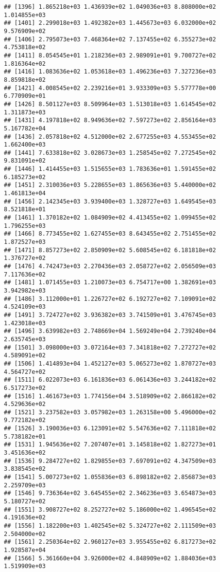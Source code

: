 \documentclass[]{article}
\begin{document}
\begin{verbatim}
## [1396] 1.865218e+03 1.436939e+02 1.049036e+03 8.808000e+02 1.014855e+03
## [1401] 2.299018e+03 1.492382e+03 1.445673e+03 6.032000e+02 9.576909e+02
## [1406] 2.795073e+03 7.468364e+02 7.137455e+02 6.355273e+02 4.753818e+02
## [1411] 8.054545e+01 1.218236e+03 2.989091e+01 9.700727e+02 1.816364e+02
## [1416] 1.083636e+02 1.053618e+03 1.496236e+03 7.327236e+03 8.859818e+02
## [1421] 4.008545e+02 2.239216e+01 3.933309e+03 5.577778e+00 6.770909e+01
## [1426] 8.501127e+03 8.509964e+03 1.513018e+03 1.614545e+02 1.311873e+03
## [1431] 4.197818e+02 8.949636e+02 7.597273e+02 2.856164e+03 5.167782e+04
## [1436] 2.057818e+02 4.512000e+02 2.677255e+03 4.553455e+02 1.662400e+03
## [1441] 7.633818e+02 3.028673e+03 1.258545e+02 7.272545e+02 9.831091e+02
## [1446] 1.414455e+03 1.515655e+03 1.783636e+01 1.591455e+02 6.185273e+02
## [1451] 2.310036e+03 5.228655e+03 1.865636e+03 5.440000e+02 1.461813e+04
## [1456] 2.142345e+03 3.939400e+03 1.328727e+03 1.649545e+03 8.521818e+01
## [1461] 1.370182e+02 1.084909e+02 4.413455e+02 1.099455e+02 1.796255e+03
## [1466] 8.773455e+02 1.627455e+03 8.643455e+02 2.751455e+02 1.872527e+03
## [1471] 8.857273e+02 2.850909e+02 5.608545e+02 6.181818e+02 1.376727e+02
## [1476] 4.742473e+03 2.270436e+03 2.058727e+02 2.056509e+03 7.117636e+02
## [1481] 1.071455e+03 1.210073e+03 6.754717e+00 1.382691e+03 3.942982e+03
## [1486] 3.112000e+01 1.226727e+02 6.192727e+02 7.109091e+02 4.524109e+03
## [1491] 3.724727e+02 3.936382e+03 3.741509e+01 3.476745e+03 1.423018e+03
## [1496] 3.639982e+03 2.748669e+04 1.569249e+04 2.739240e+04 2.635745e+03
## [1501] 3.098000e+03 3.072164e+03 7.341818e+02 7.272727e+02 4.589091e+02
## [1506] 1.414893e+04 1.452127e+03 5.065273e+02 1.870727e+03 4.564727e+02
## [1511] 6.022073e+03 6.161836e+03 6.061436e+03 3.244182e+02 6.517273e+02
## [1516] 1.461673e+03 1.774156e+04 3.518909e+02 2.866182e+02 4.529636e+02
## [1521] 3.237582e+03 3.057982e+03 1.263158e+00 5.496000e+02 9.772182e+02
## [1526] 3.190036e+03 6.123091e+02 5.547636e+02 7.111818e+02 5.738182e+01
## [1531] 1.945636e+02 7.207407e+01 3.145818e+02 1.827273e+01 3.451636e+02
## [1536] 9.284727e+02 1.829855e+03 7.697091e+02 4.347509e+03 3.838545e+02
## [1541] 5.007273e+02 1.055836e+03 6.898182e+02 2.856873e+03 2.259709e+03
## [1546] 9.736364e+02 3.645455e+02 2.346236e+03 3.654873e+03 5.180727e+02
## [1551] 3.908727e+02 8.252727e+02 5.186000e+02 1.496545e+02 4.191636e+02
## [1556] 1.182200e+03 1.402545e+02 5.324727e+02 2.111509e+03 2.504000e+02
## [1561] 2.250364e+02 2.960127e+03 3.955455e+02 6.817273e+02 1.928587e+04
## [1566] 5.361660e+04 3.926000e+02 4.848909e+02 1.884036e+03 1.519909e+03

\end{verbatim}
\end{document}

